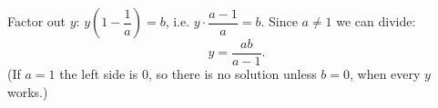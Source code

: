 Factor out $y$: $y\left(1-\dfrac{1}{a}\right)=b$, i.e. $y\cdot\dfrac{a-1}{a}=b$. Since $a\ne1$ we can divide:
\[
y=\boxed{\dfrac{ab}{a-1}}.
\]
(If $a=1$ the left side is $0$, so there is no solution unless $b=0$, when every $y$ works.)
